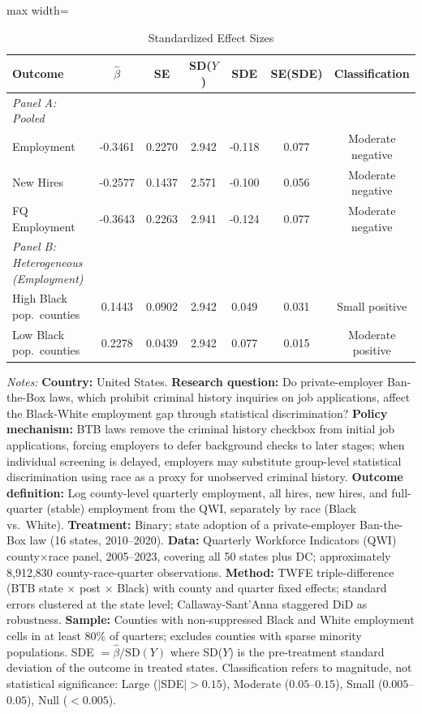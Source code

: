 \begin{table}[htbp]
\centering
\caption{Standardized Effect Sizes}
\label{tab:sde}
\begin{adjustbox}{max width=\textwidth}
\begin{tabular}{lcccccc}
\hline\hline
Outcome & $\hat{\beta}$ & SE & SD($Y$) & SDE & SE(SDE) & Classification \\
\hline
\textit{Panel A: Pooled} & & & & & & \\
Employment & -0.3461 & 0.2270 & 2.942 & -0.118 & 0.077 & Moderate negative \\
New Hires & -0.2577 & 0.1437 & 2.571 & -0.100 & 0.056 & Moderate negative \\
FQ Employment & -0.3643 & 0.2263 & 2.941 & -0.124 & 0.077 & Moderate negative \\
\hline
\textit{Panel B: Heterogeneous (Employment)} & & & & & & \\
High Black pop.\ counties & 0.1443 & 0.0902 & 2.942 & 0.049 & 0.031 & Small positive \\
Low Black pop.\ counties & 0.2278 & 0.0439 & 2.942 & 0.077 & 0.015 & Moderate positive \\
\hline\hline
\end{tabular}
\end{adjustbox}
\begin{tablenotes}[flushleft]\footnotesize
\item \textit{Notes:} \textbf{Country:} United States. \textbf{Research question:} Do private-employer Ban-the-Box laws, which prohibit criminal history inquiries on job applications, affect the Black-White employment gap through statistical discrimination? \textbf{Policy mechanism:} BTB laws remove the criminal history checkbox from initial job applications, forcing employers to defer background checks to later stages; when individual screening is delayed, employers may substitute group-level statistical discrimination using race as a proxy for unobserved criminal history. \textbf{Outcome definition:} Log county-level quarterly employment, all hires, new hires, and full-quarter (stable) employment from the QWI, separately by race (Black vs.\ White). \textbf{Treatment:} Binary; state adoption of a private-employer Ban-the-Box law (16 states, 2010--2020). \textbf{Data:} Quarterly Workforce Indicators (QWI) county$\times$race panel, 2005--2023, covering all 50 states plus DC; approximately 8,912,830 county-race-quarter observations. \textbf{Method:} TWFE triple-difference (BTB state $\times$ post $\times$ Black) with county and quarter fixed effects; standard errors clustered at the state level; Callaway-Sant'Anna staggered DiD as robustness. \textbf{Sample:} Counties with non-suppressed Black and White employment cells in at least 80\% of quarters; excludes counties with sparse minority populations. SDE $= \hat{\beta} / \text{SD}(Y)$ where SD($Y$) is the pre-treatment standard deviation of the outcome in treated states. Classification refers to magnitude, not statistical significance: Large ($|$SDE$| > 0.15$), Moderate ($0.05$--$0.15$), Small ($0.005$--$0.05$), Null ($< 0.005$).
\end{tablenotes}
\end{table}
